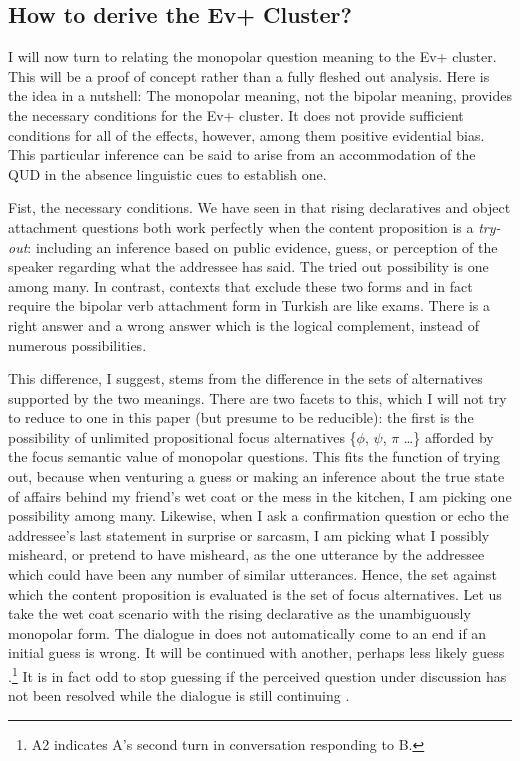 \documentclass[output=paper,colorlinks,citecolor=brown]{langscibook}
\begin{document}
\subsection{How to derive the Ev+ Cluster?}\label{sec:11:3:3}

I will now turn to relating the monopolar question meaning to the Ev+ cluster. This will be a proof of concept rather than a fully fleshed out analysis. Here is the idea in a nutshell: The monopolar meaning, not the bipolar meaning, provides the necessary conditions for the Ev+ cluster. It does not provide sufficient conditions for all of the effects, however, among them positive evidential bias. This particular inference can be said to arise from an accommodation of the QUD in the absence linguistic cues to establish one.


Fist, the necessary conditions. We have seen in  that rising declaratives and object attachment questions both work perfectly when the content proposition is a \textit{try-out}: including an inference based on public evidence, guess, or perception of the speaker regarding what the addressee has said. The tried out possibility is one among many.  In contrast, contexts that exclude these two forms and in fact require the bipolar verb attachment form in Turkish are like exams. There is a right answer and a wrong answer which is the logical complement, instead of numerous possibilities.

This difference, I suggest, stems from the difference in the sets of alternatives supported by the two meanings. There are two facets to this, which I will not try to reduce to one in this paper (but presume to be reducible): the first is the possibility of unlimited propositional focus alternatives \{$\phi$, $\psi$, $\pi$ \ldots\} afforded by the focus semantic value of monopolar questions. This fits the function of trying out, because  when venturing a guess or making an inference about the true state of affairs behind my friend's wet coat or the mess in the kitchen, I am picking one possibility among many. Likewise, when I ask a confirmation question or echo the addressee's last statement in surprise or sarcasm, I am picking what I possibly misheard, or pretend to have misheard, as the one utterance by the addressee which could have been any number of similar utterances. Hence, the set against which the content proposition is evaluated is the set of focus alternatives. Let us take the wet coat scenario with the rising declarative as the unambiguously monopolar form. The dialogue in  does not automatically come to an end if an initial guess is wrong. It will be continued with another, perhaps less likely guess .\footnote{A2 indicates A’s second turn in conversation responding to B.} It is in fact odd to stop guessing if the perceived question under discussion has not been resolved while the dialogue is still continuing . 
\end{document}
